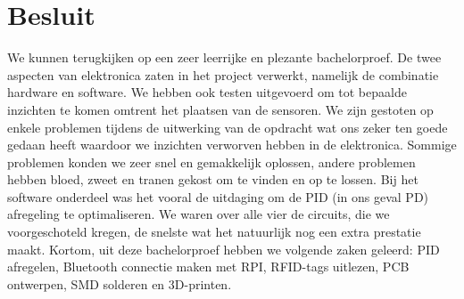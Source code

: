 \chapter{Besluit}
We kunnen terugkijken op een zeer leerrijke en plezante bachelorproef. De twee aspecten van elektronica zaten in het project verwerkt, namelijk de combinatie hardware en software. We hebben ook testen uitgevoerd  om tot bepaalde inzichten te komen omtrent het plaatsen van de sensoren. We zijn gestoten op enkele problemen tijdens de uitwerking van de opdracht wat ons zeker ten goede gedaan heeft waardoor we inzichten verworven hebben in de elektronica. Sommige problemen konden we zeer snel en gemakkelijk oplossen, andere problemen hebben bloed, zweet en tranen gekost om te vinden en op te lossen. Bij het software onderdeel was het vooral de uitdaging om de PID (in ons geval PD) afregeling te optimaliseren. We waren over alle vier de circuits, die we voorgeschoteld kregen, de snelste wat het natuurlijk nog een extra prestatie maakt. Kortom, uit deze bachelorproef hebben we volgende zaken geleerd: PID afregelen, Bluetooth connectie maken met RPI, RFID-tags uitlezen, PCB ontwerpen, SMD solderen en 3D-printen. 
